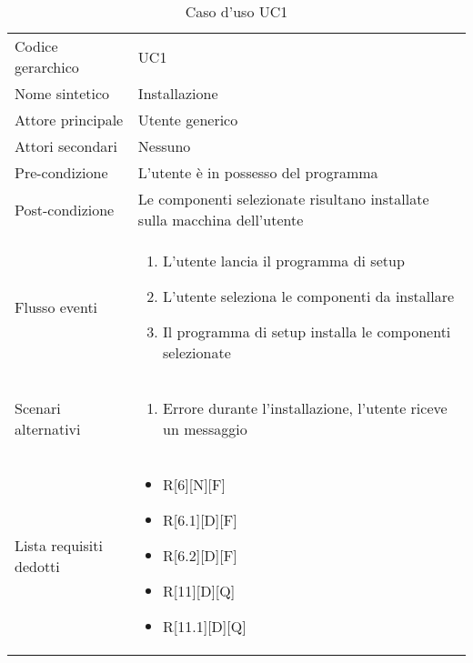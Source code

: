 \documentclass[a4paper]{report}
\begin{document}
			\begin{table}[H]
			\begin{tabularx}{\textwidth}{X | X}\toprule
				\rowcolor{orange!65}Codice gerarchico & UC1 \\
				Nome sintetico & Installazione \\
				\rowcolor{orange!65}Attore principale & Utente generico\\
				Attori secondari & Nessuno \\
				\rowcolor{orange!65}Pre-condizione & L'utente è in possesso del programma \\
				Post-condizione & Le componenti selezionate risultano installate sulla
				 macchina dell'utente \\
				\rowcolor{orange!65}Flusso eventi & \begin{enumerate}
				\item L'utente lancia il programma di setup
				\item L'utente seleziona le componenti da installare
				\item Il programma di setup installa le componenti selezionate
				\end{enumerate} \\
				Scenari alternativi & \begin{enumerate}
				\item Errore durante l'installazione, l'utente riceve un messaggio
				\end{enumerate} \\
				\rowcolor{orange!65}Lista requisiti dedotti & \begin{itemize}
				\item R[6][N][F]
				\item R[6.1][D][F]
				\item R[6.2][D][F] 
				\item R[11][D][Q]
				\item R[11.1][D][Q]
				\end{itemize} \\
				\bottomrule
			\end{tabularx}
			\caption{Caso d'uso UC1}
		 \end{table}
\end{document}
